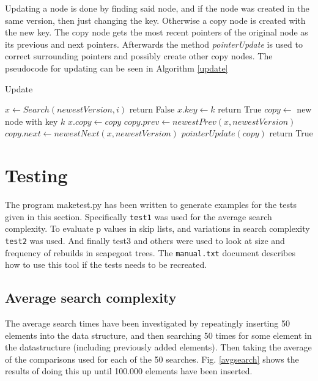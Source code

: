 \documentclass[12pt, a4paper]{article}
\begin{document}
\medskip
Updating a node is done by finding said node, and if the node was created in
the same version, then just changing the key. Otherwise a copy node is created
with the new key. The copy node gets the most recent pointers of the original node
as its previous and next pointers. Afterwards the method {\it pointerUpdate} is used
to correct surrounding pointers and possibly create other copy nodes. 
The pseudocode for updating can be seen in Algorithm \ref{update}

\begin{algorithm}
\caption{Update}\label{update}
\begin{algorithmic}[1]
    \State $x \gets Search(newestVersion, i)$
        \State return False
    \endIf
        \State $x.key \gets k$
        \State return True
    \EndIf
    \State $copy \gets$ new node with key $k$
    \State $x.copy \gets copy$
    \State $copy.prev \gets newestPrev(x, newestVersion)$
    \State $copy.next \gets newestNext(x, newestVersion)$
    \State $pointerUpdate(copy)$
    \State return True
\EndProcedure
\end{algorithmic}
\end{algorithm}

\medskip




\section*{Testing}
The program maketest.py has been written to generate examples for the tests given in this section. 
Specifically \texttt{test1} was used for the average search complexity.
To evaluate p values in skip lists, and variations in search complexity \texttt{test2} was used. 
And finally test3 and others were used to look at size and frequency of rebuilds in scapegoat trees.
The \texttt{manual.txt} document describes how to use this tool if the tests needs to be recreated.

\subsection*{Average search complexity}
The average search times have been investigated by repeatingly inserting 50 elements into the data structure, and then searching 50 times for some 
element in the datastructure (including previously added elements). Then taking the average of the comparisons used for each of the 50 searches.
Fig. \ref{avgsearch} shows the results of doing this up until 100.000 elements have been inserted.
\end{document}
